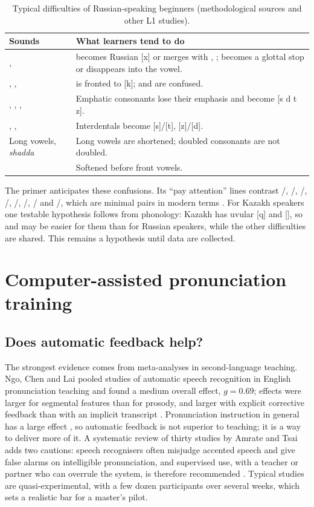 \documentclass[a4paper,14pt]{extarticle}
\begin{document}
\begin{table}[ht]
\centering\small
\caption{Typical difficulties of Russian-speaking beginners (methodological sources and other L1 studies).}
\label{tab:difficult}
\begin{tabularx}{\linewidth}{@{}P{3.2cm}L@{}}
\toprule
Sounds & What learners tend to do \\
\midrule
{},  &  becomes Russian [x] or merges with , ;  becomes a glottal stop or
  disappears into the vowel. \\
, ,  &  is fronted to [k];  and  are confused. \\
, , ,  & Emphatic consonants lose their emphasis and become [s d t z]. \\
, ,  & Interdentals become [s]/[t], [z]/[d]. \\
Long vowels, \emph{shadda} & Long vowels are shortened; doubled consonants are not doubled. \\
 & Softened before front vowels. \\
\bottomrule
\end{tabularx}
\end{table}

The primer anticipates these confusions. Its ``pay attention'' lines contrast /,
/, /, /, /, /, / and
/, which are minimal pairs in modern terms \cite{SRC-040}. For Kazakh speakers one testable
hypothesis follows from phonology: Kazakh has uvular [q] and [], so  and  may be easier for
them than for Russian speakers, while the other difficulties are shared. This remains a hypothesis until
data are collected.

\section{Computer-assisted pronunciation training}

\subsection{Does automatic feedback help?}

The strongest evidence comes from meta-analyses in second-language teaching. Ngo, Chen and Lai pooled
studies of automatic speech recognition in English pronunciation teaching and found a medium overall
effect, $g = 0.69$; effects were larger for segmental features than for prosody, and larger with
explicit corrective feedback than with an implicit transcript \cite{SRC-025}. Pronunciation instruction in
general has a large effect \cite{SRC-105}, so automatic feedback is not superior to teaching; it is a way
to deliver more of it. A systematic review of thirty studies by Amrate and Tsai adds two cautions: speech
recognisers often misjudge accented speech and give false alarms on intelligible pronunciation, and
supervised use, with a teacher or partner who can overrule the system, is therefore recommended
\cite{SRC-026}. Typical studies are quasi-experimental, with a few dozen participants over several weeks,
which sets a realistic bar for a master's pilot.
\end{document}
